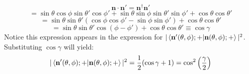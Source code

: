\begin{sol}
\begin{equation}
	\mathbf{n}\cdot\mathbf{n'}=\mathbf{n}^\dagger\mathbf{n}'
\end{equation}
\begin{equation}
	=\sin\theta\cos\phi\sin\theta'\cos\phi'+\sin\theta\sin\phi\sin\theta'\sin\phi'+\cos\theta\cos\theta'
\end{equation} 
\begin{equation}
	=\sin\theta\sin\theta'(\cos\phi\cos\phi'-\sin\phi\sin\phi')+\cos\theta\cos\theta'
\end{equation} 
\begin{equation}
	=\sin\theta\sin\theta'\cos(\phi-\phi')+\cos\theta\cos\theta'\equiv\cos\gamma
\end{equation} 
Notice this expression appears in the expression for $|\braket{\mathbf{n'}(\theta,\phi);+}{\mathbf{n}(\theta,\phi);+}|^2$. Substituting $\cos\gamma$ will yield:
\begin{equation}
	|\braket{\mathbf{n'}(\theta,\phi);+}{\mathbf{n}(\theta,\phi);+}|^2=\frac{1}{2}(\cos\gamma+1)=\cos^2\left(\frac{\gamma}{2}\right)
\end{equation} 
\end{sol}